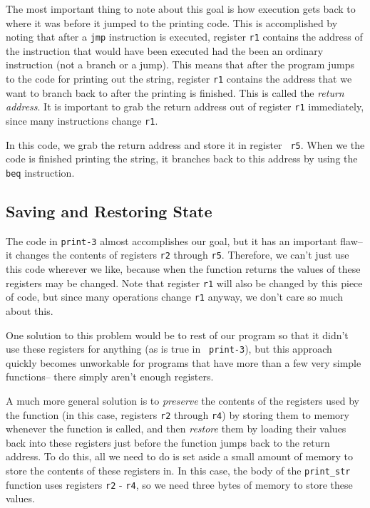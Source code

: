 \documentclass[makeidx,psfig]{article}
\begin{document}
The most important thing to note about this goal is how execution gets
back to where it was before it jumped to the printing code.  This is
accomplished by noting that after a {\tt jmp} instruction is executed,
register {\tt r1} contains the address of the instruction that would
have been executed had the been an ordinary instruction (not a branch
or a jump).  This means that after the program jumps to the code for
printing out the string, register {\tt r1} contains the address that
we want to branch back to after the printing is finished.  This is
called the {\em return address}.  It is important to grab the return
address out of register {\tt r1} immediately, since many instructions
change {\tt r1}.

In this code, we grab the return address and store it in register {\tt
r5}.  When we the code is finished printing the string, it branches
back to this address by using the {\tt beq} instruction.

\subsection{Saving and Restoring State}

The code in {\tt print-3} almost accomplishes our goal, but it has an
important flaw-- it changes the contents of registers {\tt r2} through
{\tt r5}.  Therefore, we can't just use this code wherever we like,
because when the function returns the values of these registers may be
changed.  Note that register {\tt r1} will also be changed by this
piece of code, but since many operations change {\tt r1} anyway, we
don't care so much about this.

One solution to this problem would be to rest of our program so that
it didn't use these registers for anything (as is true in {\tt
print-3}), but this approach quickly becomes unworkable for programs
that have more than a few very simple functions-- there simply aren't
enough registers.

A much more general solution is to {\em preserve} the contents of the
registers used by the function (in this case, registers {\tt r2}
through {\tt r4}) by storing them to memory whenever the function is
called, and then {\em restore} them by loading their values back into
these registers just before the function jumps back to the return
address.  To do this, all we need to do is set aside a small amount of
memory to store the contents of these registers in.  In this case,
the body of the {\tt print\_str} function uses registers {\tt r2} - {\tt r4},
so we need three bytes of memory to store these values.
\end{document}

